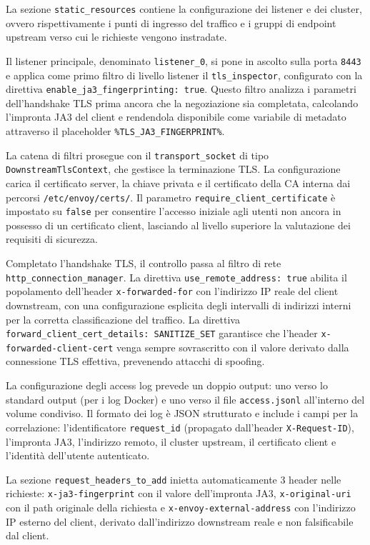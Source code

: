 La sezione \texttt{static\_resources} contiene la configurazione dei listener e dei cluster, ovvero rispettivamente i punti di ingresso del traffico e i gruppi di endpoint upstream verso cui le richieste vengono instradate.

Il listener principale, denominato \texttt{listener\_0}, si pone in ascolto sulla porta \texttt{8443} e applica come primo filtro di livello listener il \texttt{tls\_inspector}, configurato con la direttiva \texttt{enable\_ja3\_fingerprinting: true}. Questo filtro analizza i parametri dell'handshake TLS prima ancora che la negoziazione sia completata, calcolando l'impronta JA3 del client e rendendola disponibile come variabile di metadato attraverso il placeholder \texttt{\%TLS\_JA3\_FINGERPRINT\%}.

La catena di filtri prosegue con il \texttt{transport\_socket} di tipo \texttt{DownstreamTlsContext}, che gestisce la terminazione TLS. La configurazione carica il certificato server, la chiave privata e il certificato della CA interna dai percorsi \texttt{/etc/envoy/certs/}. Il parametro \texttt{require\_client\_certificate} è impostato su \texttt{false} per consentire l'accesso iniziale agli utenti non ancora in possesso di un certificato client, lasciando al livello superiore la valutazione dei requisiti di sicurezza.

Completato l'handshake TLS, il controllo passa al filtro di rete \texttt{http\_connection\_manager}. La direttiva \texttt{use\_remote\_address: true} abilita il popolamento dell'header \texttt{x-forwarded-for} con l'indirizzo IP reale del client downstream, con una configurazione esplicita degli intervalli di indirizzi interni per la corretta classificazione del traffico. La direttiva \texttt{forward\_client\_cert\_details: SANITIZE\_SET} garantisce che l'header \texttt{x-forwarded-client-cert} venga sempre sovrascritto con il valore derivato dalla connessione TLS effettiva, prevenendo attacchi di spoofing.

La configurazione degli access log prevede un doppio output: uno verso lo standard output (per i log Docker) e uno verso il file \texttt{access.jsonl} all'interno del volume condiviso. Il formato dei log è JSON strutturato e include i campi per la correlazione: l'identificatore \texttt{request\_id} (propagato dall'header \texttt{X-Request-ID}), l'impronta JA3, l'indirizzo remoto, il cluster upstream, il certificato client e l'identità dell'utente autenticato.

La sezione \texttt{request\_headers\_to\_add} inietta automaticamente 3 header nelle richieste: \texttt{x-ja3-fingerprint} con il valore dell'impronta JA3, \texttt{x-original-uri} con il path originale della richiesta e \texttt{x-envoy-external-address} con l'indirizzo IP esterno del client, derivato dall'indirizzo downstream reale e non falsificabile dal client.

